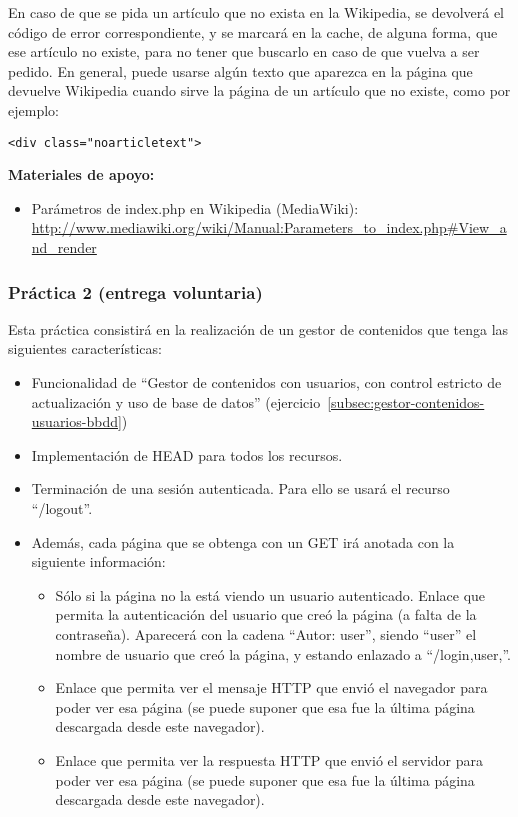 En caso de que se pida un artículo que no exista en la Wikipedia, se devolverá el código de error correspondiente, y se marcará en la cache, de alguna forma, que ese artículo no existe, para no tener que buscarlo en caso de que vuelva a ser pedido. En general, puede usarse algún texto que aparezca en la página que devuelve Wikipedia cuando sirve la página de un artículo que no existe, como por ejemplo:

\begin{verbatim}
<div class="noarticletext">
\end{verbatim}

\textbf{Materiales de apoyo:}

\begin{itemize}
\item Parámetros de index.php en Wikipedia (MediaWiki):
\url{http://www.mediawiki.org/wiki/Manual:Parameters_to_index.php#View_and_render}
\end{itemize}

\subsubsection{Práctica 2 (entrega voluntaria)}
\label{subsec:practica-vol-2-2010}

Esta práctica consistirá en la realización de un gestor de contenidos que tenga las siguientes características:

\begin{itemize}
\item Funcionalidad de ``Gestor de contenidos con usuarios, con control estricto de actualización y uso de base de datos'' (ejercicio~\ref{subsec:gestor-contenidos-usuarios-bbdd})

\item Implementación de HEAD para todos los recursos.

\item Terminación de una sesión autenticada. Para ello se usará el recurso ``/logout''.

\item Además, cada página que se obtenga con un GET irá anotada con la siguiente información:
  \begin{itemize}
  \item Sólo si la página no la está viendo un usuario autenticado. Enlace que permita la autenticación del usuario que creó la página (a falta de la contraseña). Aparecerá con la cadena ``Autor: user'', siendo ``user'' el nombre de usuario que creó la página, y estando enlazado a ``/login,user,''.
  \item Enlace que permita ver el mensaje HTTP que envió el navegador para poder ver esa página (se puede suponer que esa fue la última página descargada desde este navegador).
  \item Enlace que permita ver la respuesta HTTP que envió el servidor para poder ver esa página (se puede suponer que esa fue la última página descargada desde este navegador).
  \end{itemize}
\end{itemize}

